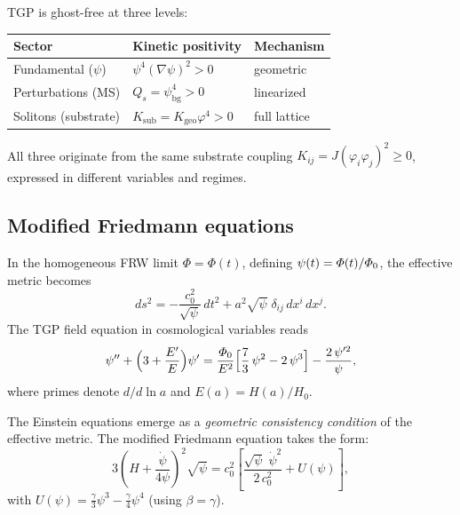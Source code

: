 \begin{remark}
TGP is ghost-free at three levels:
\begin{center}\small
\begin{tabular}{@{}lll@{}}
\toprule
\textbf{Sector} & \textbf{Kinetic positivity} & \textbf{Mechanism} \\
\midrule
Fundamental ($\psi$)   & $\psi^{4}(\nabla\psi)^{2}>0$
  & geometric \\
Perturbations (MS)     & $Q_{s}=\psi_{\mathrm{bg}}^{4}>0$
  & linearized \\
Solitons (substrate)   & $K_{\mathrm{sub}}=K_{\mathrm{geo}}\varphi^{4}>0$
  & full lattice \\
\bottomrule
\end{tabular}
\end{center}
All three originate from the same substrate coupling
$K_{ij}=J(\varphi_{i}\varphi_{j})^{2}\geq 0$, expressed in
different variables and regimes.
\end{remark}

\subsection{Modified Friedmann equations}\label{ssec:friedmann-en}

In the homogeneous FRW limit $\Phi=\Phi(t)$, defining
$\psi(t)=\varPhi(t)/\varPhi_0$, the effective metric becomes
\begin{equation}
  ds^{2} = -\frac{c_{0}^{2}}{\sqrt{\psi}}\,dt^{2}
         + a^{2}\sqrt{\psi}\;\delta_{ij}\,dx^{i}\,dx^{j}.
\end{equation}
The TGP field equation in cosmological variables reads
\begin{equation}\label{eq:psi-cosmo}
  \psi'' + \Bigl(3 + \frac{E'}{E}\Bigr)\psi'
  = \frac{\varPhi_0}{E^{2}}
    \Bigl[\frac{7}{3}\,\psi^{2} - 2\,\psi^{3}\Bigr]
  - \frac{2\,\psi'^{2}}{\psi},
\end{equation}
where primes denote $d/d\ln a$ and $E(a)=H(a)/H_{0}$.

The Einstein equations emerge as a \emph{geometric consistency
condition} of the effective metric.  The modified Friedmann
equation takes the form:
\begin{equation}\label{eq:friedmann-mod}
  \boxed{
    3\!\left(H + \frac{\dot\psi}{4\psi}\right)^{\!2}\!\sqrt{\psi}
    = c_{0}^{2}\!\left[
      \frac{\sqrt{\psi}\;\dot\psi^{2}}{2\,c_{0}^{2}}
      + U(\psi)
    \right],
  }
\end{equation}
with $U(\psi) = \frac{\gamma}{3}\psi^{3} - \frac{\gamma}{4}\psi^{4}$
(using $\beta=\gamma$).

